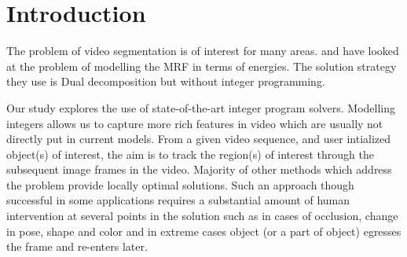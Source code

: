 \section{Introduction}

The problem of video segmentation is of interest for many areas. 
\cite{Komodakis2007a, Komodakis2011a} and \cite{Tsai2010}
have looked at the problem of modelling the MRF in terms of energies. 
The solution strategy they use is Dual decomposition but without integer programming.

Our study explores the use of state-of-the-art integer program solvers. Modelling integers
allows us to capture more rich features in video which are usually not directly put in current 
models. 
From a given video sequence, and user intialized object(s)
of interest, the aim is to track the region(s) of interest through
the subsequent image frames in the video. Majority of other
methods which address the problem provide locally optimal
solutions. Such an approach though successful in some applications
requires a substantial amount of human intervention
at several points in the solution such as in cases of occlusion,
change in pose, shape and color and in extreme cases object
(or a part of object) egresses the frame and re-enters later.